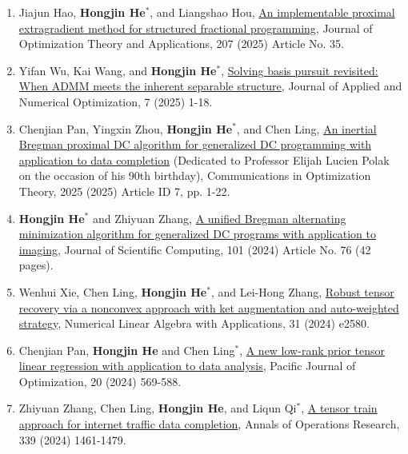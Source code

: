 \begin{enumerate}
	\item Jiajun Hao, {\bf Hongjin He}$^*$, and Liangshao Hou, \href{https://link.springer.com/article/10.1007/s10957-025-02799-x}{\color{blue}An implementable proximal extragradient method for structured fractional programming}, Journal of Optimization Theory and Applications, 207 (2025) Article No. 35.
				
	\item Yifan Wu, Kai Wang, and {\bf Hongjin He}$^*$, \href{https://jano.biemdas.com/issues/JANO2025-1-1.pdf}{Solving basis pursuit revisited: When ADMM meets the inherent separable structure}, Journal of Applied and Numerical Optimization, 7 (2025) 1-18.
	
	\item Chenjian Pan, Yingxin Zhou, {\bf \color{black}Hongjin He}$^*$, and Chen Ling, \href{https://cot.mathres.org/archives/1889}{An inertial Bregman proximal DC algorithm for generalized DC programming with application to data completion} ({\color{red}Dedicated to Professor Elijah Lucien Polak on the occasion of his 90th birthday}), Communications in Optimization Theory, 2025 (2025) Article ID 7, pp. 1-22.
		
	\item {\bf Hongjin He}$^*$ and Zhiyuan Zhang, \href{https://doi.org/10.1007/s10915-024-02715-x}{\color{blue}A unified Bregman alternating minimization algorithm for generalized DC programs with application to imaging}, Journal of Scientific Computing, 101 (2024) Article No. 76 (42 pages).
	
   \item Wenhui Xie, Chen Ling, {\bf \color{black}Hongjin He}$^*$, and Lei-Hong Zhang, \href{https://onlinelibrary.wiley.com/doi/abs/10.1002/nla.2580}{\color{blue}Robust tensor recovery via a nonconvex approach with ket augmentation and auto-weighted strategy},  Numerical Linear Algebra with Applications, 31 (2024) e2580.
	
	\item Chenjian Pan, {\bf\color{black}Hongjin He} and Chen Ling$^*$, \href{http://www.yokohamapublishers.jp/online2/pjov20-3.html}{A new low-rank prior tensor linear regression with application to data analysis}, Pacific Journal of Optimization, 20 (2024) 569-588.
		 	   
    \item Zhiyuan Zhang, Chen Ling, {\bf\color{black}Hongjin He}, and Liqun Qi$^*$, \href{https://doi.org/10.1007/s10479-021-04147-4}{\color{blue}A tensor train approach for internet traffic data completion}, Annals of Operations Research, 339 (2024) 1461-1479.
	 

\end{enumerate}
